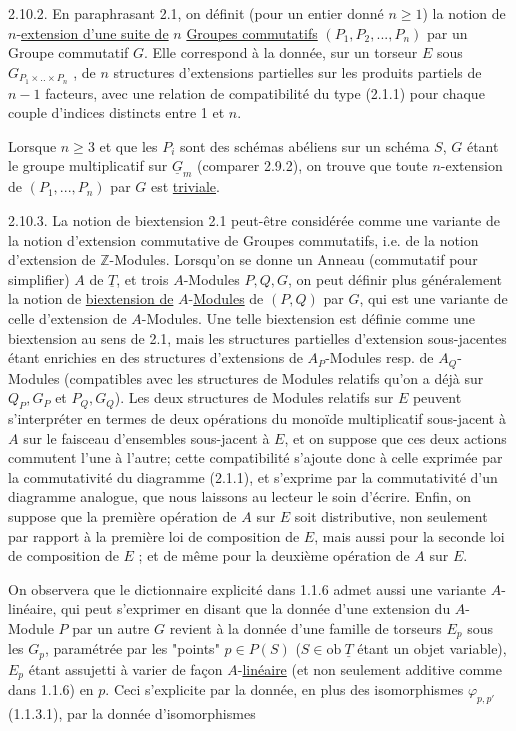 2.10.2.  En paraphrasant 2.1, on définit (pour un entier donné $n \geq 1$) la notion de $n$-\underline{extension d'une suite de} $n$ \underline{Groupes commutatifs} $(P_1,P_2,...,P_n)$ par un Groupe commutatif $G$. Elle correspond à la donnée, sur un torseur $E$ sous $G_{P_1\times..\times P_n}$ , de $n$ structures d'extensions partielles sur les produits partiels de $n-1$ facteurs, avec une relation de compatibilité du type (2.1.1) pour chaque couple d'indices distincts entre 1 et $n$.

          Lorsque $n \geq 3$ et que les $P_i$ sont des schémas abéliens sur un schéma $S$, $G$ étant le groupe multiplicatif sur $\underline{G}_m$ (comparer 2.9.2), on trouve que toute $n$-extension de $(P_1,...,P_n)$ par $G$ est \underline{triviale}.

2.10.3.  La notion de biextension 2.1 peut-être considérée comme une variante de la notion d'extension commutative de Groupes commutatifs, i.e. de la notion d'extension de $\mathbb{Z}$-Modules. Lorsqu'on se donne un Anneau (commutatif pour simplifier) $A$ de $\underline{T}$, et trois $A$-Modules $P,Q,G$, on peut
définir plus généralement la notion de \underline{biextension de} $A$-\underline{Modules} de $(P,Q)$ par $G$, qui est une variante de celle d'extension de $A$-Modules. Une telle biextension est définie comme une biextension au sens de 2.1, mais les structures partielles d'extension sous-jacentes étant enrichies en des structures d'extensions de $A_P$-Modules resp. de $A_Q$-Modules (compatibles avec les structures de Modules relatifs qu'on a déjà sur $Q_P,G_P$ et $P_Q,G_Q$). Les deux structures de Modules relatifs sur $E$ peuvent s'interpréter en termes de deux opérations du monoïde multiplicatif sous-jacent à $A$ sur le faisceau d'ensembles sous-jacent à $E$, et on suppose que ces deux actions commutent l'une à l'autre; cette compatibilité s'ajoute donc à celle exprimée par la commutativité du diagramme (2.1.1), et s'exprime par la commutativité d'un diagramme analogue, que nous laissons au lecteur le soin d'écrire. Enfin, on suppose que la première opération de $A$ sur $E$ soit distributive, non seulement par rapport à la première loi de composition de $E$, mais aussi pour la seconde loi de composition de $E$ ; et de même pour la deuxième opération de $A$ sur $E$.

          On observera que le dictionnaire explicité dans 1.1.6 admet aussi une variante $A$-linéaire, qui peut s'exprimer en disant que la donnée d'une extension du $A$-Module $P$ par un autre $G$ revient à la donnée d'une famille de torseurs $E_p$ sous les $G_p$, paramétrée par les "points" $p \in P(S)$ ($S \in \mathrm{ob}\ \underline{T}$ étant un objet variable), $E_p$ étant assujetti à varier de façon $A$-\underline{linéaire} (et non seulement additive comme dans 1.1.6) en $p$. Ceci s'explicite par la donnée, en plus des isomorphismes $\varphi_{p,p'}$ (1.1.3.1), par la donnée d'isomorphismes

